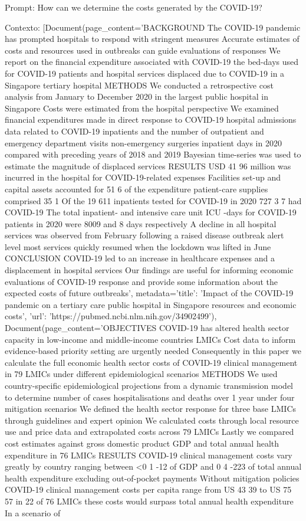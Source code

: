 Prompt: How can we determine the costs generated by the COVID-19?

Contexto: [Document(page\_content='BACKGROUND The COVID-19 pandemic has prompted hospitals to respond with stringent measures Accurate estimates of costs and resources used in outbreaks can guide evaluations of responses We report on the financial expenditure associated with COVID-19 the bed-days used for COVID-19 patients and hospital services displaced due to COVID-19 in a Singapore tertiary hospital METHODS We conducted a retrospective cost analysis from January to December 2020 in the largest public hospital in Singapore Costs were estimated from the hospital perspective We examined financial expenditures made in direct response to COVID-19 hospital admissions data related to COVID-19 inpatients and the number of outpatient and emergency department visits non-emergency surgeries inpatient days in 2020 compared with preceding years of 2018 and 2019 Bayesian time-series was used to estimate the magnitude of displaced services RESULTS USD 41 96 million was incurred in the hospital for COVID-19-related expenses Facilities set-up and capital assets accounted for 51 6 of the expenditure patient-care supplies comprised 35 1 Of the 19 611 inpatients tested for COVID-19 in 2020 727 3 7 had COVID-19 The total inpatient- and intensive care unit ICU -days for COVID-19 patients in 2020 were 8009 and 8 days respectively A decline in all hospital services was observed from February following a raised disease outbreak alert level most services quickly resumed when the lockdown was lifted in June CONCLUSION COVID-19 led to an increase in healthcare expenses and a displacement in hospital services Our findings are useful for informing economic evaluations of COVID-19 response and provide some information about the expected costs of future outbreaks', metadata={'title': 'Impact of the COVID-19 pandemic on a tertiary care public hospital in Singapore resources and economic costs', 'url': 'https://pubmed.ncbi.nlm.nih.gov/34902499'}), Document(page\_content='OBJECTIVES COVID-19 has altered health sector capacity in low-income and middle-income countries LMICs Cost data to inform evidence-based priority setting are urgently needed Consequently in this paper we calculate the full economic health sector costs of COVID-19 clinical management in 79 LMICs under different epidemiological scenarios METHODS We used country-specific epidemiological projections from a dynamic transmission model to determine number of cases hospitalisations and deaths over 1 year under four mitigation scenarios We defined the health sector response for three base LMICs through guidelines and expert opinion We calculated costs through local resource use and price data and extrapolated costs across 79 LMICs Lastly we compared cost estimates against gross domestic product GDP and total annual health expenditure in 76 LMICs RESULTS COVID-19 clinical management costs vary greatly by country ranging between <0 1 -12 of GDP and 0 4 -223 of total annual health expenditure excluding out-of-pocket payments Without mitigation policies COVID-19 clinical management costs per capita range from US 43 39 to US 75 57 in 22 of 76 LMICs these costs would surpass total annual health expenditure In a scenario of 